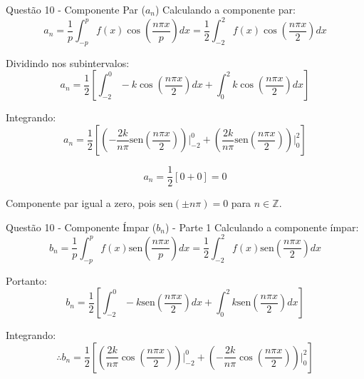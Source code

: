 \documentclass[8pt,aspectratio = 169]{beamer}
\begin{document}
\begin{frame}{Questão 10 - Componente Par ($a_n$)}
    Calculando a componente par:
    \begin{equation*}
        a_n = \frac{1}{p} \int_{-p}^{p} f(x) \cos\left(\frac{n\pi x}{p}\right) dx = \frac{1}{2} \int_{-2}^{2} f(x) \cos\left(\frac{n\pi x}{2}\right) dx
    \end{equation*}
    
    Dividindo nos subintervalos:
    \begin{equation*}
        a_n = \frac{1}{2} \left[ \int_{-2}^{0} -k \cos\left(\frac{n\pi x}{2}\right) dx + \int_{0}^{2} k \cos\left(\frac{n\pi x}{2}\right) dx \right]
    \end{equation*}
    
    Integrando:
    \begin{equation*}
        a_n = \frac{1}{2} \left[ \left( -\frac{2k}{n\pi} \text{sen}\left(\frac{n\pi x}{2}\right) \right) \Bigg|_{-2}^{0} + \left( \frac{2k}{n\pi} \text{sen}\left(\frac{n\pi x}{2}\right) \right) \Bigg|_{0}^{2} \right]
    \end{equation*}
    
    \begin{equation*}
        a_n = \frac{1}{2} [ 0 + 0 ] = 0
    \end{equation*}
    
    \vspace{0.3cm}
    Componente par igual a zero, pois $\text{sen}(\pm n\pi) = 0$ para $n \in \mathbb{Z}$.
\end{frame}

\begin{frame}{Questão 10 - Componente Ímpar ($b_n$) - Parte 1}
    Calculando a componente ímpar:
    \begin{equation*}
        b_n = \frac{1}{p} \int_{-p}^{p} f(x) \text{sen}\left(\frac{n\pi x}{p}\right) dx = \frac{1}{2} \int_{-2}^{2} f(x) \text{sen}\left(\frac{n\pi x}{2}\right) dx
    \end{equation*}
    
    Portanto:
    \begin{equation*}
        b_n = \frac{1}{2} \left[ \int_{-2}^{0} -k \text{sen}\left(\frac{n\pi x}{2}\right) dx + \int_{0}^{2} k \text{sen}\left(\frac{n\pi x}{2}\right) dx \right]
    \end{equation*}
    
    Integrando:
    \begin{equation*}
        \therefore b_n = \frac{1}{2} \left[ \left( \frac{2k}{n\pi} \cos\left(\frac{n\pi x}{2}\right) \right) \Bigg|_{-2}^{0} + \left( -\frac{2k}{n\pi} \cos\left(\frac{n\pi x}{2}\right) \right) \Bigg|_{0}^{2} \right]
    \end{equation*}
\end{frame}
\end{document}
